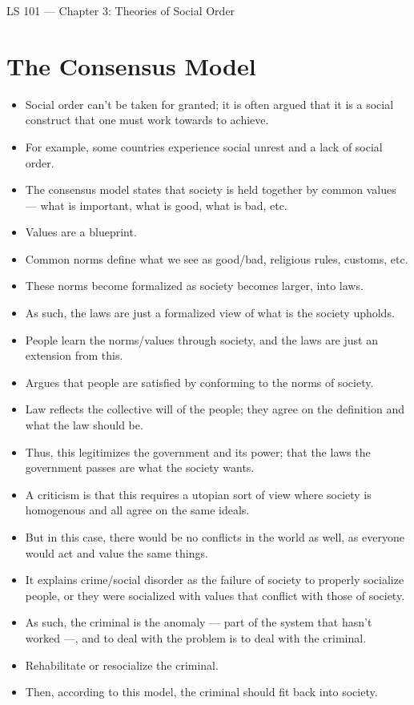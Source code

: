 \documentclass{article}
\author{Clement Tsang}
\begin{document}
\begin{center}
    \Large{LS 101 --- Chapter 3: Theories of Social Order}
\end{center}

\section{The Consensus Model}
\begin{itemize}
    \item Social order can't be taken for granted; it is often argued that it is a social construct that one must work towards to achieve.
    \item For example, some countries experience social unrest and a lack of social order.
    \item The consensus model states that society is held together by common values --- what is important, what is good, what is bad, etc.
    \item Values are a blueprint.
    \item Common norms define what we see as good/bad, religious rules, customs, etc.
    \item These norms become formalized as society becomes larger, into laws.
    \item As such, the laws are just a formalized view of what is the society upholds.
    \item People learn the norms/values through society, and the laws are just an extension from this.
    \item Argues that people are satisfied by conforming to the norms of society.
    \item Law reflects the collective will of the people; they agree on the definition and what the law should be.
    \item Thus, this legitimizes the government and its power; that the laws the government passes are what the society wants.
    \item A criticism is that this requires a utopian sort of view where society is homogenous and all agree on the same ideals.
    \item But in this case, there would be no conflicts in the world as well, as everyone would act and value the same things.
    \item It explains crime/social disorder as the failure of society to properly socialize people, or they were socialized with values that conflict with those of society.
    \item As such, the criminal is the anomaly --- part of the system that hasn't worked ---, and to deal with the problem is to deal with the criminal.
    \item Rehabilitate or resocialize the criminal.
    \item Then, according to this model, the criminal should fit back into society.
\end{itemize}
\end{document}
